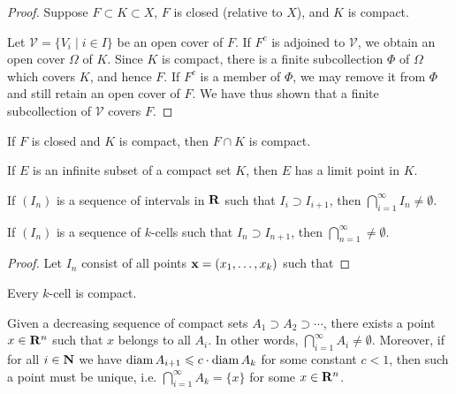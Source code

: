 \begin{proof}
Suppose $F\subset K\subset X$, $F$ is closed (relative to $X$), and $K$ is compact.

Let $\mathcal{V}=\{V_i\mid i\in I\}$ be an open cover of $F$. If $F^c$ is adjoined to $\mathcal{V}$, we obtain an open cover $\Omega$ of $K$. Since $K$ is compact, there is a finite subcollection $\Phi$ of $\Omega$ which covers $K$, and hence $F$. If $F^c$ is a member of $\Phi$, we may remove it from $\Phi$ and still retain an open cover of $F$. We have thus shown that a finite subcollection of $\mathcal{V}$ covers $F$.
\end{proof}

\begin{corollary}
If $F$ is closed and $K$ is compact, then $F\cap K$ is compact.
\end{corollary}

\begin{proposition}
If $E$ is an infinite subset of a compact set $K$, then $E$ has a limit point in $K$.
\end{proposition}

\begin{proposition}
If $(I_n)$ is a sequence of intervals in $\mathbf R$ such that $I_i\supset I_{i+1}$, then $\bigcap_{i=1}^{\infty}I_n\neq\emptyset$.
\end{proposition}

\begin{proposition}
If $(I_n)$ is a sequence of $k$-cells such that $I_n\supset I_{n+1}$, then $\bigcap_{n=1}^{\infty}\neq\emptyset$.
\end{proposition}

\begin{proof}
Let $I_n$ consist of all points $\vb{x}=(x_1,\dots,x_k)$ such that
\end{proof}

\begin{proposition}
Every $k$-cell is compact.
\end{proposition}

\begin{theorem}\label{thrm:cantor-intersection}
Given a decreasing sequence of compact sets $A_1\supset A_2 \supset \cdots$, there exists a point $x\in\mathbf R^n$ such that $x$ belongs to all $A_i$. In other words, $\bigcap_{i=1}^\infty A_i\neq\emptyset$. Moreover, if for all $i\in\mathbf N$ we have $\operatorname{diam} A_{i+1}\leqslant c\cdot\operatorname{diam} A_k$ for some constant $c<1$, then such a point must be unique, i.e. $\bigcap_{i=1}^\infty A_k=\{x\}$ for some $x\in\mathbf R^n$.
\end{theorem}

